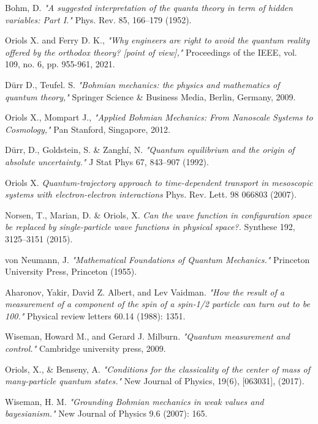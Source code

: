 \documentclass[11pt, a4paper]{article} %
\begin{document}
\newpage
\begin{thebibliography}{1}
{\footnotesize 

Bohm, D. {\em "A suggested interpretation of the quanta theory in term of hidden variables: Part I."} Phys. Rev. 85, 166–179 (1952).

Oriols X. and Ferry D. K., {\em "Why engineers are right to avoid the quantum reality offered by the orthodox theory? [point of view],"} Proceedings of the IEEE, vol. 109, no. 6, pp. 955-961, 2021.

Dürr D., Teufel. S. {\em "Bohmian mechanics: the physics and mathematics of quantum theory,"} Springer Science \& Business Media, Berlin, Germany, 2009.

	Oriols X., Mompart J., {\em "Applied Bohmian Mechanics: From Nanoscale Systems to Cosmology,"} Pan Stanford, Singapore, 2012.
	
Dürr, D., Goldstein, S. \& Zanghí, N. {\em "Quantum equilibrium and the origin of absolute uncertainty."} J Stat Phys 67, 843–907 (1992).

Oriols X. {\em Quantum-trajectory approach to time-dependent transport in mesoscopic systems with electron-electron interactions} Phys. Rev. Lett. 98 066803 (2007).

Norsen, T., Marian, D. \& Oriols, X. {\em Can the wave function in configuration space be replaced by single-particle wave functions in physical space?.} Synthese 192, 3125–3151 (2015).


von Neumann, J. {\em "Mathematical Foundations of Quantum Mechanics."} Princeton University Press, Princeton (1955).

Aharonov, Yakir, David Z. Albert, and Lev Vaidman. {\em "How the result of a measurement of a component of the spin of a spin-1/2 particle can turn out to be 100."} Physical review letters 60.14 (1988): 1351.

Wiseman, Howard M., and Gerard J. Milburn. {\em "Quantum measurement and control."} Cambridge university press, 2009.

Oriols, X., \& Benseny, A. {\em "Conditions for the classicality of the center of mass of many-particle quantum states."} New Journal of Physics, 19(6), [063031],  (2017).

Wiseman, H. M. {\em "Grounding Bohmian mechanics in weak values and bayesianism."} New Journal of Physics 9.6 (2007): 165.

}
\end{thebibliography}
\end{document}
